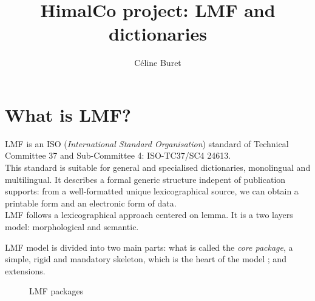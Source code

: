 \documentclass[a4paper,12pt]{article}
\title{HimalCo project: LMF and dictionaries}
\author{C\'eline Buret}
\begin{document}
\maketitle
\newpage
\section{What is LMF?}

LMF is an ISO (\textit{International Standard Organisation}) standard of Technical Committee 37 and Sub-Committee 4: ISO-TC37/SC4 24613.\\
This standard is suitable for general and specialised dictionaries, monolingual and multilingual. It describes a formal generic structure indepent of publication supports: from a well-formatted unique lexicographical source, we can obtain a printable form and an electronic form of data.\\
LMF follows a lexicographical approach centered on lemma. It is a two layers model: morphological and semantic.

\pagebreak %
LMF model is divided into two main parts: what is called the \textit{core package}, a simple, rigid and mandatory skeleton, which is the heart of the model ; and extensions.

\begin{figure}[h]
\centerline{}
\caption{LMF packages}
\end{figure}
\end{document}
